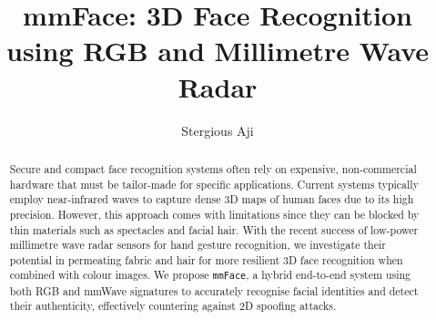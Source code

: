 \documentclass{mpaper}
\begin{document}
\title{mmFace: 3D Face Recognition using RGB and Millimetre Wave Radar}
\author{Stergious Aji}

\maketitle

\begin{abstract}
    Secure and compact face recognition systems often rely on expensive, non-commercial hardware that must be tailor-made for specific applications. Current systems typically employ near-infrared waves to capture dense 3D maps of human faces due to its high precision. However, this approach comes with limitations since they can be blocked by thin materials such as spectacles and facial hair. With the recent success of low-power millimetre wave radar sensors for hand gesture recognition, we investigate their potential in permeating fabric and hair for more resilient 3D face recognition when combined with colour images. We propose \texttt{mmFace}, a hybrid end-to-end system using both RGB and mmWave signatures to accurately recognise facial identities and detect their authenticity, effectively countering against 2D spoofing attacks.
\end{abstract}
\vspace{-0.1cm}

\end{document}
